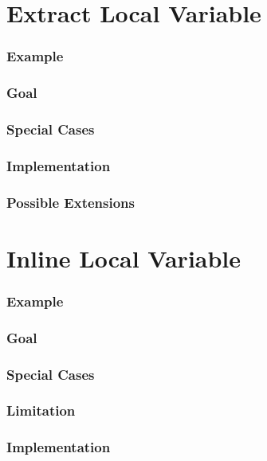 \documentclass[12pt,halfparskip]{scrreprt}
\begin{document}
\section{Extract Local Variable}

\subsubsection{Example}

\subsubsection{Goal}

\subsubsection{Special Cases}

\subsubsection{Implementation}

\subsubsection{Possible Extensions}

\section{Inline Local Variable}


\subsubsection{Example}


\subsubsection{Goal}

\subsubsection{Special Cases}

\subsubsection{Limitation}


\subsubsection{Implementation}
\end{document}
